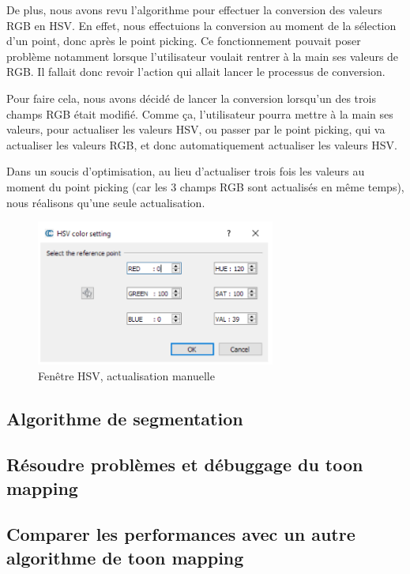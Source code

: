 \documentclass[12pt,titlepage,french]{article}
\begin{document}
De plus, nous avons revu l'algorithme pour effectuer la conversion des valeurs RGB en HSV. En effet, nous effectuions la conversion au moment de la sélection d'un point, donc après le point picking. Ce fonctionnement pouvait poser problème notamment lorsque l'utilisateur voulait rentrer à la main ses valeurs de RGB. Il fallait donc revoir l'action qui allait lancer le processus de conversion. \newline

Pour faire cela, nous avons décidé de lancer la conversion lorsqu'un des trois champs RGB était modifié. Comme ça, l'utilisateur pourra mettre à la main ses valeurs, pour actualiser les valeurs HSV, ou passer par le point picking, qui va actualiser les valeurs RGB, et donc automatiquement actualiser les valeurs HSV. \newline

Dans un soucis d'optimisation, au lieu d'actualiser trois fois les valeurs au moment du point picking (car les 3 champs RGB sont actualisés en même temps), nous réalisons qu'une seule actualisation.

\begin{figure}[H]
 \caption{\label{} Fenêtre HSV, actualisation manuelle}
 \begin{center}
 \includegraphics[width=0.7\textwidth]{./img/hsv.PNG}
  \end{center}
\end{figure}

\subsection{Algorithme de segmentation}

\subsection{Résoudre problèmes et débuggage du toon mapping}

\subsection{Comparer les performances avec un autre algorithme de toon mapping}
\end{document}
